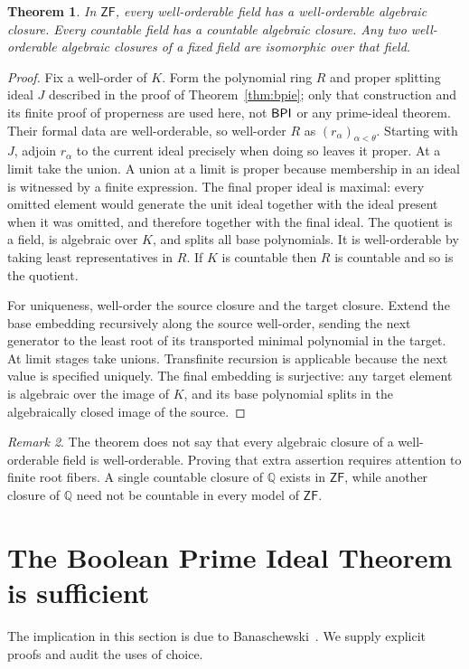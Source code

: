 \documentclass[11pt,a4paper]{article}
\newtheorem{theorem}{Theorem}[section]
\theoremstyle{definition}\newtheorem{definition}[theorem]{Definition}
\theoremstyle{remark}\newtheorem{remark}[theorem]{Remark}
\newcommand{\ZF}{\mathsf{ZF}}\newcommand{\ZFA}{\mathsf{ZFA}}
\newcommand{\Q}{\mathbb Q}\newcommand{\F}{\mathbb F}
\begin{document}
\begin{theorem}\label{thm:wo}
In $\ZF$, every well-orderable field has a well-orderable algebraic closure. Every countable field has a countable algebraic closure. Any two well-orderable algebraic closures of a fixed field are isomorphic over that field.
\end{theorem}
\begin{proof}
Fix a well-order of $K$. Form the polynomial ring $R$ and proper splitting ideal $J$ described in the proof of Theorem~\ref{thm:bpie}; only that construction and its finite proof of properness are used here, not $\mathsf{BPI}$ or any prime-ideal theorem. Their formal data are well-orderable, so well-order $R$ as $(r_\alpha)_{\alpha<\theta}$. Starting with $J$, adjoin $r_\alpha$ to the current ideal precisely when doing so leaves it proper. At a limit take the union. A union at a limit is proper because membership in an ideal is witnessed by a finite expression. The final proper ideal is maximal: every omitted element would generate the unit ideal together with the ideal present when it was omitted, and therefore together with the final ideal. The quotient is a field, is algebraic over $K$, and splits all base polynomials. It is well-orderable by taking least representatives in $R$. If $K$ is countable then $R$ is countable and so is the quotient.

For uniqueness, well-order the source closure and the target closure. Extend the base embedding recursively along the source well-order, sending the next generator to the least root of its transported minimal polynomial in the target. At limit stages take unions. Transfinite recursion is applicable because the next value is specified uniquely. The final embedding is surjective: any target element is algebraic over the image of $K$, and its base polynomial splits in the algebraically closed image of the source.
\end{proof}

\begin{remark}
The theorem does not say that every algebraic closure of a well-orderable field is well-orderable. Proving that extra assertion requires attention to finite root fibers. A single countable closure of $\Q$ exists in $\ZF$, while another closure of $\Q$ need not be countable in every model of $\ZF$.
\end{remark}

\section{The Boolean Prime Ideal Theorem is sufficient}
The implication in this section is due to Banaschewski~\cite{Banaschewski}. We supply explicit proofs and audit the uses of choice.
\end{document}
